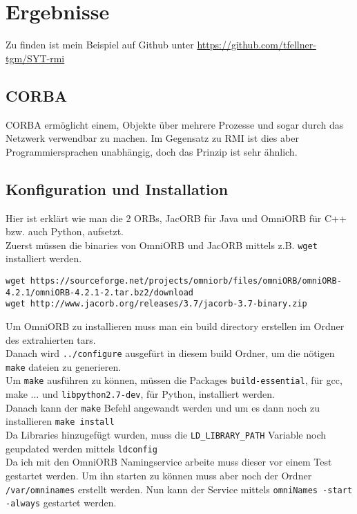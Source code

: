 
\section{Ergebnisse}
\label{sec:Ergebnisse}

Zu finden ist mein Beispiel auf Github unter \url{https://github.com/tfellner-tgm/SYT-rmi} \cite{repo}

\subsection{CORBA}

CORBA erm\"oglicht einem, Objekte \"uber mehrere Prozesse und sogar durch das Netzwerk verwendbar zu machen. Im Gegensatz zu RMI ist dies aber Programmiersprachen unabh\"angig, doch das Prinzip ist sehr \"ahnlich.

\subsection{Konfiguration und Installation}

Hier ist erkl\"art wie man die 2 ORBs, JacORB f\"ur Java und OmniORB f\"ur C++ bzw. auch Python, aufsetzt.
\\
Zuerst m\"ussen die binaries von OmniORB und JacORB mittels z.B. \texttt{wget} installiert werden. 

\begin{lstlisting}[style=bash, caption=Download von OmniORB und JacORB]
wget https://sourceforge.net/projects/omniorb/files/omniORB/omniORB-4.2.1/omniORB-4.2.1-2.tar.bz2/download
wget http://www.jacorb.org/releases/3.7/jacorb-3.7-binary.zip
\end{lstlisting}

Um OmniORB zu installieren muss man ein build directory erstellen im Ordner des extrahierten tars. \\
Danach wird \texttt{../configure} ausgef\"urt in diesem build Ordner, um die n\"otigen \texttt{make} dateien zu generieren. \\
Um \texttt{make} ausf\"uhren zu k\"onnen, m\"ussen die Packages \texttt{build-essential}, f\"ur gcc, make ... und \texttt{libpython2.7-dev}, f\"ur Python, installiert werden.\\
Danach kann der \texttt{make} Befehl angewandt werden und um es dann noch zu installieren \texttt{make install}\\
Da Libraries hinzugef\"ugt wurden, muss die \texttt{LD\_LIBRARY\_PATH} Variable noch geupdated werden mittels \texttt{ldconfig} \\
Da ich mit den OmniORB Namingservice arbeite muss dieser vor einem Test gestartet werden. Um ihn starten zu k\"onnen muss aber noch der Ordner \texttt{/var/omninames} erstellt werden.
Nun kann der Service mittels \texttt{omniNames -start -always} gestartet werden.\\


